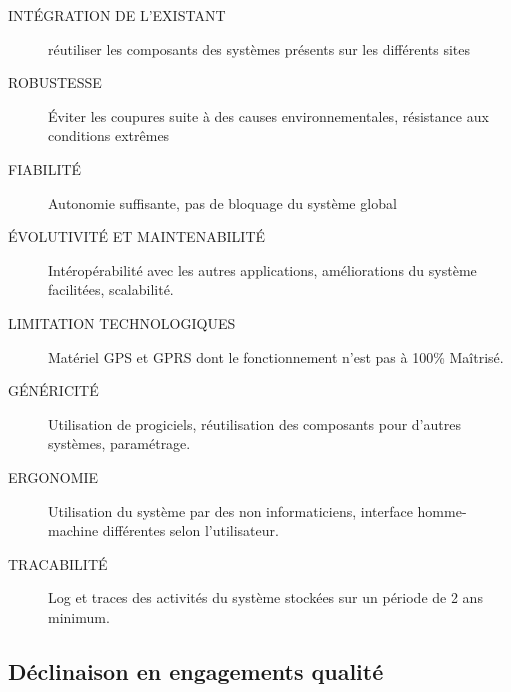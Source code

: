\documentclass{mise_en_page}
\begin{document}
\begin{description}
	\item[INTÉGRATION DE L'EXISTANT] réutiliser les composants des systèmes présents sur les différents sites
	\item[ROBUSTESSE] Éviter les coupures suite à des causes environnementales, résistance aux conditions extrêmes
	\item[FIABILITÉ] Autonomie suffisante, pas de bloquage du système global
	\item[ÉVOLUTIVITÉ ET MAINTENABILITÉ] Intéropérabilité avec les autres applications, améliorations du système facilitées, scalabilité.
	\item[LIMITATION TECHNOLOGIQUES] Matériel GPS et GPRS dont le fonctionnement n'est pas à 100\% Maîtrisé.
	\item[GÉNÉRICITÉ] Utilisation de progiciels, réutilisation des composants pour d'autres systèmes, paramétrage.
	\item[ERGONOMIE] Utilisation du système par des non informaticiens, interface homme-machine différentes selon l'utilisateur.
	\item[TRACABILITÉ] Log et traces des activités du système stockées sur un période de 2 ans minimum.
\end{description}

\subsection{Déclinaison en engagements qualité}
\end{document}
